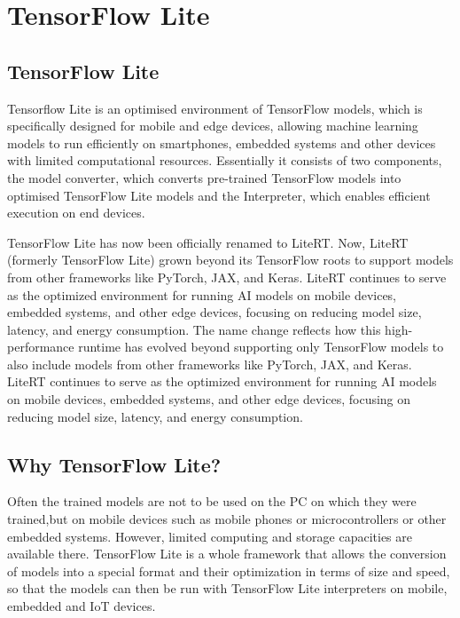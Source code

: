 
%
%
%
%

\chapter{TensorFlow Lite}

\section{TensorFlow Lite}\label{sec:TensorFlow Lite}

Tensorflow Lite is an optimised environment of TensorFlow models, which is specifically designed for mobile and edge devices, allowing machine learning models to run efficiently on smartphones, embedded systems and other devices with limited computational resources.
Essentially it consists of two components, the model converter, which converts pre-trained TensorFlow models into optimised TensorFlow Lite models and the Interpreter, which enables efficient execution on end devices. \cite{TensorFlowLite:2024} 

\medskip

TensorFlow Lite has now been officially renamed to LiteRT. Now, LiteRT (formerly TensorFlow Lite) grown beyond its TensorFlow roots to support models from other frameworks like PyTorch, JAX, and Keras. LiteRT continues to serve as the optimized environment for running AI models on mobile devices, embedded systems, and other edge devices, focusing on reducing model size, latency, and energy consumption.
The name change reflects how this high-performance runtime has evolved beyond supporting only TensorFlow models to also include models from other frameworks like PyTorch, JAX, and Keras. LiteRT continues to serve as the optimized environment for running AI models on mobile devices, embedded systems, and other edge devices, focusing on reducing model size, latency, and energy consumption. \cite{Li:2024b}

\section{Why TensorFlow Lite?}
Often the trained models are not to be used on the PC on which they were trained,but on mobile devices such as mobile phones or microcontrollers or other embedded systems. However, limited computing and storage capacities are available there. TensorFlow Lite is a whole framework that allows the conversion of models into a special format and their optimization in terms of size and speed, so that the models can then be run with TensorFlow Lite interpreters on mobile, embedded and IoT devices. \cite{TensorFlowLiteGuide:2024}

